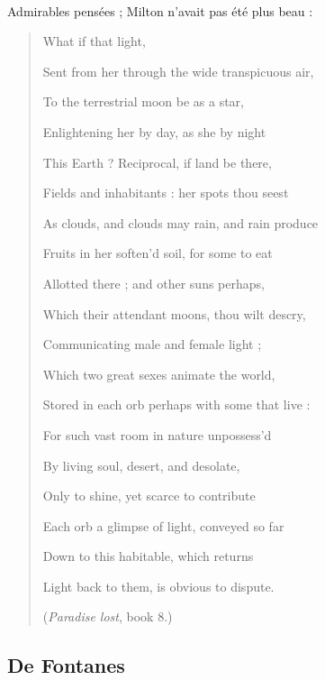\documentclass[a4paper, 11pt, oneside]{article}
\begin{document}
\paragraph{}
Admirables pensées ; Milton n'avait pas été plus beau :
\begin{quotation}
\hspace*{15mm}What if that light,

Sent from her through the wide transpicuous air,

To the terrestrial moon be as a star,

Enlightening her by day, as she by night

This Earth ? Reciprocal, if land be there,

Fields and inhabitants : her spots thou seest

As clouds, and clouds may rain, and rain produce

Fruits in her soften'd soil, for some to eat

Allotted there ; and other suns perhaps,

Which their attendant moons, thou wilt descry,

Communicating male and female light ;

Which two great sexes animate the world,

Stored in each orb perhaps with some that live :

For such vast room in nature unpossess'd

By living soul, desert, and desolate,

Only to shine, yet scarce to contribute

Each orb a glimpse of light, conveyed so far

Down to this habitable, which returns

Light back to them, is obvious to dispute.

\hspace*{5mm}(\emph{Paradise lost}, book 8.)
\end{quotation}
\clearpage
\subsection{De Fontanes}
\end{document}
